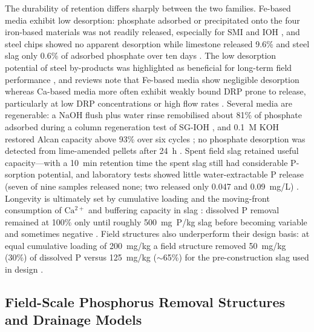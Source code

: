 The durability of retention differs sharply between the two families. Fe-based
media exhibit low desorption: phosphate adsorbed or precipitated onto the four
iron-based materials was not readily released, especially for SMI and IOH
\parencite{Allred2014}, and steel chips showed no apparent desorption while
limestone released 9.6\% and steel slag only 0.6\% of adsorbed phosphate over ten
days \parencite{Sellner2019b}. The low desorption potential of steel by-products
was highlighted as beneficial for long-term field performance
\parencite{Sellner2019b}, and reviews note that Fe-based media show negligible
desorption whereas Ca-based media more often exhibit weakly bound DRP prone to
release, particularly at low DRP concentrations or high flow rates
\parencite{Mendes2022}. Several media are regenerable: a NaOH flush plus water
rinse remobilised about 81\% of phosphate adsorbed during a column regeneration
test of SG-IOH \parencite{Allred2017}, and 0.1~M KOH restored Alcan capacity above
93\% over six cycles \parencite{Kumari2025}; no phosphate desorption was detected
from lime-amended pellets after 24~h \parencite{Li2017}. Spent field slag retained
useful capacity---with a 10~min retention time the spent slag still had
considerable P-sorption potential, and laboratory tests showed little
water-extractable P release (seven of nine samples released none; two released
only 0.047 and 0.09~mg/L) \parencite{Shedekar2020}. Longevity is ultimately set by
cumulative loading and the moving-front consumption of $\mathrm{Ca^{2+}}$ and
buffering capacity in slag \parencite{Wang2020d}: dissolved P removal remained at
100\% only until roughly 500~mg~P/kg slag before becoming variable and sometimes
negative \parencite{Penn2020}. Field structures also underperform their design
basis: at equal cumulative loading of 200~mg/kg a field structure removed
50~mg/kg (30\%) of dissolved P versus 125~mg/kg ($\sim$65\%) for the
pre-construction slag used in design \parencite{Shedekar2020}.

\subsection{Field-Scale Phosphorus Removal Structures and Drainage Models}

